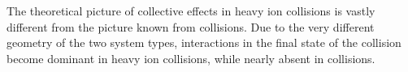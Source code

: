 \documentclass[ALICE,manyauthors]{StrinJet}
\begin{document}




The theoretical picture of collective effects in heavy ion collisions is vastly different from the picture known from \pp collisions. Due to the very different geometry of the two system types, interactions in the final state of the collision become dominant in heavy ion collisions, while nearly absent in \pp collisions.


\newenvironment{acknowledgement}{\relax}{\relax}
%





\newpage
\appendix
 
\end{document}
